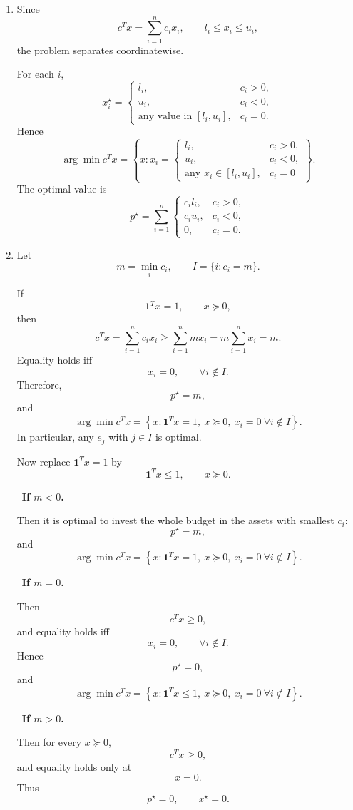 \documentclass[11pt,letter,notitlepage]{article}
\theoremstyle{definition}
\begin{document}
\begin{solution}
\begin{enumerate}[label=(\alph*)]
\medskip

\item
Since
\[
c^Tx=\sum_{i=1}^n c_i x_i,
\qquad
l_i\le x_i\le u_i,
\]
the problem separates coordinatewise.

For each \(i\),
\[
x_i^\star=
\begin{cases}
l_i, & c_i>0,\\[0.3em]
u_i, & c_i<0,\\[0.3em]
\text{any value in }[l_i,u_i], & c_i=0.
\end{cases}
\]
Hence
\[
\arg\min c^Tx
=
\left\{
x:
x_i=
\begin{cases}
l_i, & c_i>0,\\
u_i, & c_i<0,\\
\text{any }x_i\in[l_i,u_i], & c_i=0
\end{cases}
\right\}.
\]
The optimal value is
\[
p^\star=\sum_{i=1}^n
\begin{cases}
c_i l_i, & c_i>0,\\
c_i u_i, & c_i<0,\\
0, & c_i=0.
\end{cases}
\]

\medskip

\item
Let
\[
m=\min_i c_i,
\qquad
I=\{i:c_i=m\}.
\]

If
\[
\mathbf 1^Tx=1,\qquad x\succeq 0,
\]
then
\[
c^Tx=\sum_{i=1}^n c_i x_i \ge \sum_{i=1}^n m x_i=m\sum_{i=1}^n x_i=m.
\]
Equality holds iff
\[
x_i=0,\qquad \forall i\notin I.
\]
Therefore,
\[
p^\star=m,
\]
and
\[
\arg\min c^Tx
=
\left\{
x:
\mathbf 1^Tx=1,\ x\succeq 0,\ x_i=0\ \forall i\notin I
\right\}.
\]
In particular, any \(e_j\) with \(j\in I\) is optimal.

Now replace \(\mathbf 1^Tx=1\) by
\[
\mathbf 1^Tx\le 1,\qquad x\succeq 0.
\]

\ \textbf{If \(m<0\).}

Then it is optimal to invest the whole budget in the assets with smallest \(c_i\):
\[
p^\star=m,
\]
and
\[
\arg\min c^Tx
=
\left\{
x:
\mathbf 1^Tx=1,\ x\succeq 0,\ x_i=0\ \forall i\notin I
\right\}.
\]

\ \textbf{If \(m=0\).}

Then
\[
c^Tx\ge 0,
\]
and equality holds iff
\[
x_i=0,\qquad \forall i\notin I.
\]
Hence
\[
p^\star=0,
\]
and
\[
\arg\min c^Tx
=
\left\{
x:
\mathbf 1^Tx\le 1,\ x\succeq 0,\ x_i=0\ \forall i\notin I
\right\}.
\]

\ \textbf{If \(m>0\).}

Then for every \(x\succeq 0\),
\[
c^Tx\ge 0,
\]
and equality holds only at
\[
x=0.
\]
Thus
\[
p^\star=0,
\qquad
x^\star=0.
\]

\end{enumerate}

\end{solution}
\end{document}
